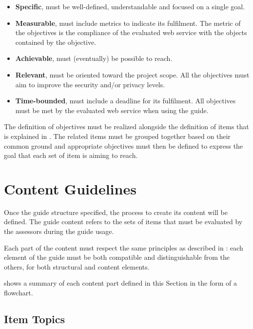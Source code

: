 \begin{itemize}
    \item \textbf{Specific}, must be well-defined, understandable and focused on a single goal.
    \item \textbf{Measurable}, must include metrics to indicate its fulfilment. The metric of the objectives is the compliance of the evaluated web service with the objects contained by the objective.
    \item \textbf{Achievable}, must (eventually) be possible to reach.
    \item \textbf{Relevant}, must be oriented toward the project scope. All the objectives must aim to improve the security and/or privacy levels.
    \item \textbf{Time-bounded}, must include a deadline for its fulfilment. All objectives must be met by the evaluated web service when using the guide.
\end{itemize}

The definition of objectives must be realized alongside the definition of items that is explained in . The related items must be grouped together based on their common ground and appropriate objectives must then be defined to express the goal that each set of item is aiming to reach. 


\section{Content Guidelines}
\label{sec:proposal_content}

Once the guide structure specified, the process to create its content will be defined. The guide content refers to the sets of items that must be evaluated by the assessors during the guide usage.

Each part of the content must respect the same principles as described in : each element of the guide must be both compatible and distinguishable from the others, for both structural and content elements.

 shows a summary of each content part defined in this Section in the form of a flowchart.

\subsection{Item Topics}
\label{subsec:proposal_content_topic}

